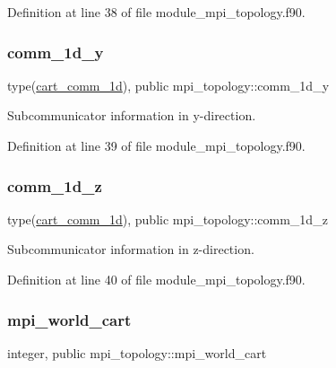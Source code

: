 Definition at line 38 of file module\+\_\+mpi\+\_\+topology.\+f90.

\mbox{\label{namespacempi__topology_ad48a88602b9b9950200733823f95b5d0}} 
\subsubsection{\texorpdfstring{comm\_1d\_y}{comm\_1d\_y}}
{\footnotesize\ttfamily type(\mbox{\hyperlink{structmpi__topology_1_1cart__comm__1d}{cart\+\_\+comm\+\_\+1d}}), public mpi\+\_\+topology\+::comm\+\_\+1d\+\_\+y}



Subcommunicator information in y-\/direction. 



Definition at line 39 of file module\+\_\+mpi\+\_\+topology.\+f90.

\mbox{\label{namespacempi__topology_aed5c66dd4697b116c53db4613ad802ce}} 
\subsubsection{\texorpdfstring{comm\_1d\_z}{comm\_1d\_z}}
{\footnotesize\ttfamily type(\mbox{\hyperlink{structmpi__topology_1_1cart__comm__1d}{cart\+\_\+comm\+\_\+1d}}), public mpi\+\_\+topology\+::comm\+\_\+1d\+\_\+z}



Subcommunicator information in z-\/direction. 



Definition at line 40 of file module\+\_\+mpi\+\_\+topology.\+f90.

\mbox{\label{namespacempi__topology_a2b10bc780ba4b14ea773c36f3e489a94}} 
\subsubsection{\texorpdfstring{mpi\_world\_cart}{mpi\_world\_cart}}
{\footnotesize\ttfamily integer, public mpi\+\_\+topology\+::mpi\+\_\+world\+\_\+cart}



